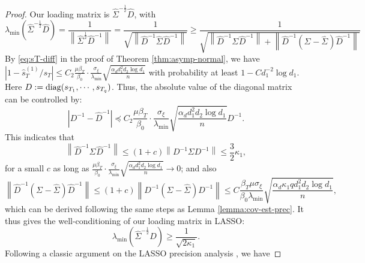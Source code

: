 \documentclass[12pt]{article}
\newcommand{\abs}[1]{\left\lvert#1\right\rvert}
\newcommand{\norm}[1]{\left\lVert#1\right\rVert}
\theoremstyle{plain}
\begin{document}
\begin{proof}
Our loading matrix is $\widehat{\Sigma}^{-\frac{1}{2}}\widehat{D}$, with
\begin{equation*}
\lambda_{\min}(\widehat{\Sigma}^{-\frac{1}{2}}\widehat{D})   = \frac{1}{\norm{\widehat{\Sigma}^{\frac{1}{2}}\widehat{D}^{-1} } }=\frac{1}{\sqrt{\norm{\widehat{D}^{-1}\widehat{\Sigma}^{}\widehat{D}^{-1} } }}\ge \frac{1}{\sqrt{\norm{\widehat{D}^{-1}{\Sigma}^{}\widehat{D}^{-1} } + \norm{\widehat{D}^{-1}\left({\Sigma}^{} -\widehat{\Sigma}^{} \right) \widehat{D}^{-1} } }}
\end{equation*}
By \eqref{eq:sT-diff} in the proof of Theorem \ref{thm:asymp-normal}, we have $\abs{1- \widehat{s}_T^{(1)}/s_T}\le  C_2  \frac{\mu\beta_T }{\beta_0} \cdot \frac{\sigma_{\xi}}{\lambda_{\min}} \sqrt{\frac{\alpha_d d_1^2 d_2 \log d_1}{n}} $ with probability at least $1-Cd_1^{-2}\log d_1 $. Here $D:={\rm diag}(s_{T_1},\cdots, s_{T_q})$. 
Thus, the absolute value of the diagonal matrix can be controlled by:
\begin{equation}
   \abs{ D^{-1}-\widehat{D}^{-1}}\preceq C_2  \frac{\mu\beta_T }{\beta_0} \cdot \frac{\sigma_{\xi}}{\lambda_{\min}} \sqrt{\frac{\alpha_d d_1^2 d_2 \log d_1}{n}} D^{-1}.
\end{equation}
This indicates that 
\begin{equation*}
   \norm{\widehat{D}^{-1}{\Sigma}^{}\widehat{D}^{-1} }\le (1+c)\norm{D^{-1}\Sigma D^{-1} }\le \frac{3}{2}\kappa_1,
\end{equation*}
for a small $c$ as long as $  \frac{\mu\beta_T }{\beta_0} \cdot \frac{\sigma_{\xi}}{\lambda_{\min}} \sqrt{\frac{\alpha_d d_1^2 d_2 \log d_1}{n}} \to 0$; and also
\begin{equation*}
    \norm{\widehat{D}^{-1}\left({\Sigma}^{} -\widehat{\Sigma}^{} \right) \widehat{D}^{-1} } \le (1+c)  \norm{{D}^{-1}\left({\Sigma}^{} -\widehat{\Sigma}^{} \right) {D}^{-1} }\le C\frac{\beta_T \mu \sigma_\xi }{\beta_0 \lambda_{\min} }\sqrt{\frac{\alpha_d \kappa_1 q d_1^2 d_2 \log d_1 }{n}},
\end{equation*}
which can be derived following the same steps as Lemma \ref{lemma:cov-est-prec}. It thus gives the well-conditioning of our loading matrix in LASSO:
\begin{equation*}
    \lambda_{\min} \left(\widehat{\Sigma}^{-\frac{1}{2}}\widehat{D}\right)\ge \frac{1}{\sqrt{2\kappa_1}}.
\end{equation*}
Following a classic argument on the LASSO precision analysis \citep{van2009conditions,buhlmann2011statistics}, we have


\end{proof}
\end{document}
